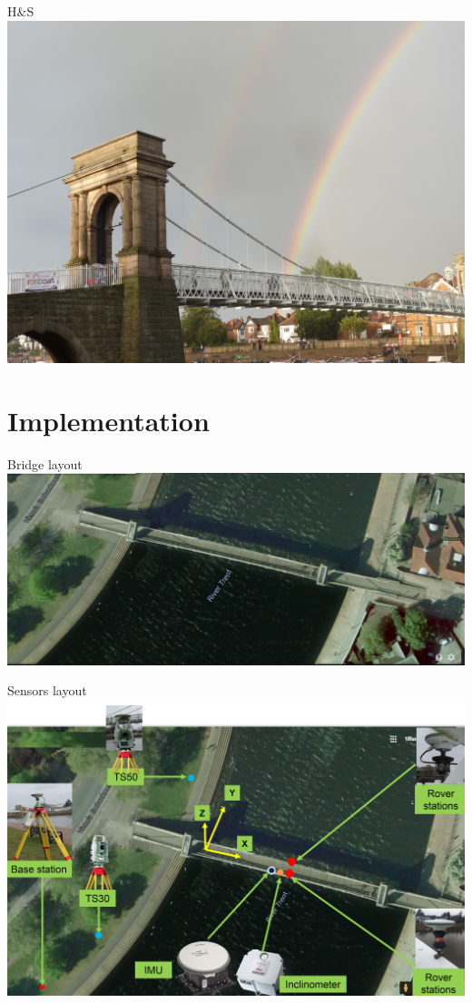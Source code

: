 \documentclass[11pt]{beamer}
\begin{document}
\begin{frame}{H\&S}%
	\includegraphics[width=.7\textwidth]{pic/rainbow.jpg}
\end{frame}


\section{Implementation}

\begin{frame}{Bridge layout}%
	\centering
	\includegraphics[height=.6\textheight]{pic/BridgeBare.jpg}
\end{frame}

\begin{frame}{Sensors layout}%
	\centering
	\includegraphics[height=.7\textheight]{pic/layout.jpg}

\end{frame}
\end{document}
